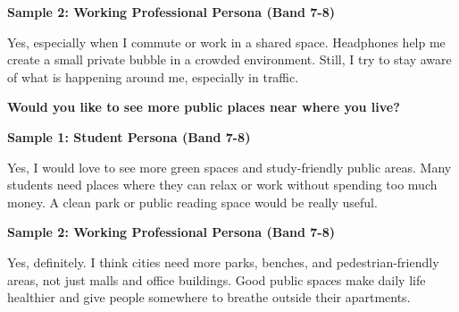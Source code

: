\textbf{Sample 2: Working Professional Persona (Band 7-8)}

Yes, especially when I commute or work in a shared space. Headphones help me create a small private bubble in a crowded environment. Still, I try to stay aware of what is happening around me, especially in traffic.

\separator

\begin{ieltsquestion}
\textbf{Would you like to see more public places near where you live?}
\end{ieltsquestion}
\textbf{Sample 1: Student Persona (Band 7-8)}

Yes, I would love to see more green spaces and study-friendly public areas. Many students need places where they can relax or work without spending too much money. A clean park or public reading space would be really useful.

\textbf{Sample 2: Working Professional Persona (Band 7-8)}

Yes, definitely. I think cities need more parks, benches, and pedestrian-friendly areas, not just malls and office buildings. Good public spaces make daily life healthier and give people somewhere to breathe outside their apartments.

\separator


